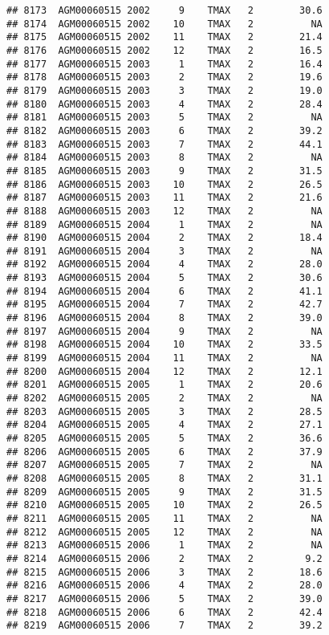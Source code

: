\documentclass{article}\usepackage[]{graphicx}\usepackage[]{color}
\makeatletter
\newenvironment{kframe}{%
 \def\at@end@of@kframe{}%
 \ifinner\ifhmode%
  \def\at@end@of@kframe{\end{minipage}}%
  \begin{minipage}{\columnwidth}%
 \fi\fi%
 \def\FrameCommand##1{\hskip\@totalleftmargin \hskip-\fboxsep
 \colorbox{shadecolor}{##1}\hskip-\fboxsep
     \hskip-\linewidth \hskip-\@totalleftmargin \hskip\columnwidth}%
 \MakeFramed {\advance\hsize-\width
   \@totalleftmargin\z@ \linewidth\hsize
   \@setminipage}}%
 {\par\unskip\endMakeFramed%
 \at@end@of@kframe}
\newenvironment{knitrout}{}{} %
\makeatother
\begin{document}
\begin{knitrout}
\begin{kframe}
\begin{verbatim}
## 8173  AGM00060515 2002     9    TMAX   2        30.6
## 8174  AGM00060515 2002    10    TMAX   2          NA
## 8175  AGM00060515 2002    11    TMAX   2        21.4
## 8176  AGM00060515 2002    12    TMAX   2        16.5
## 8177  AGM00060515 2003     1    TMAX   2        16.4
## 8178  AGM00060515 2003     2    TMAX   2        19.6
## 8179  AGM00060515 2003     3    TMAX   2        19.0
## 8180  AGM00060515 2003     4    TMAX   2        28.4
## 8181  AGM00060515 2003     5    TMAX   2          NA
## 8182  AGM00060515 2003     6    TMAX   2        39.2
## 8183  AGM00060515 2003     7    TMAX   2        44.1
## 8184  AGM00060515 2003     8    TMAX   2          NA
## 8185  AGM00060515 2003     9    TMAX   2        31.5
## 8186  AGM00060515 2003    10    TMAX   2        26.5
## 8187  AGM00060515 2003    11    TMAX   2        21.6
## 8188  AGM00060515 2003    12    TMAX   2          NA
## 8189  AGM00060515 2004     1    TMAX   2          NA
## 8190  AGM00060515 2004     2    TMAX   2        18.4
## 8191  AGM00060515 2004     3    TMAX   2          NA
## 8192  AGM00060515 2004     4    TMAX   2        28.0
## 8193  AGM00060515 2004     5    TMAX   2        30.6
## 8194  AGM00060515 2004     6    TMAX   2        41.1
## 8195  AGM00060515 2004     7    TMAX   2        42.7
## 8196  AGM00060515 2004     8    TMAX   2        39.0
## 8197  AGM00060515 2004     9    TMAX   2          NA
## 8198  AGM00060515 2004    10    TMAX   2        33.5
## 8199  AGM00060515 2004    11    TMAX   2          NA
## 8200  AGM00060515 2004    12    TMAX   2        12.1
## 8201  AGM00060515 2005     1    TMAX   2        20.6
## 8202  AGM00060515 2005     2    TMAX   2          NA
## 8203  AGM00060515 2005     3    TMAX   2        28.5
## 8204  AGM00060515 2005     4    TMAX   2        27.1
## 8205  AGM00060515 2005     5    TMAX   2        36.6
## 8206  AGM00060515 2005     6    TMAX   2        37.9
## 8207  AGM00060515 2005     7    TMAX   2          NA
## 8208  AGM00060515 2005     8    TMAX   2        31.1
## 8209  AGM00060515 2005     9    TMAX   2        31.5
## 8210  AGM00060515 2005    10    TMAX   2        26.5
## 8211  AGM00060515 2005    11    TMAX   2          NA
## 8212  AGM00060515 2005    12    TMAX   2          NA
## 8213  AGM00060515 2006     1    TMAX   2          NA
## 8214  AGM00060515 2006     2    TMAX   2         9.2
## 8215  AGM00060515 2006     3    TMAX   2        18.6
## 8216  AGM00060515 2006     4    TMAX   2        28.0
## 8217  AGM00060515 2006     5    TMAX   2        39.0
## 8218  AGM00060515 2006     6    TMAX   2        42.4
## 8219  AGM00060515 2006     7    TMAX   2        39.2

\end{verbatim}
\end{kframe}
\end{knitrout}
\end{document}
